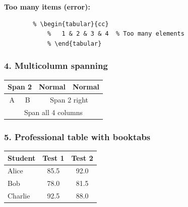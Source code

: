 \documentclass[12pt,a4paper]{article}
\begin{document}
	\textbf{Too many items (error):}
	\begin{verbatim}
		% \begin{tabular}{cc}
			%   1 & 2 & 3 & 4  % Too many elements
			% \end{tabular}
	\end{verbatim}
	
	\subsubsection*{4. Multicolumn spanning}
	\begin{tabular}{|c|c|c|c|}
		\hline
		\multicolumn{2}{|c|}{Span 2} & Normal & Normal \\
		\hline
		A & B & \multicolumn{2}{c|}{Span 2 right} \\
		\hline
		\multicolumn{4}{|c|}{Span all 4 columns} \\
		\hline
	\end{tabular}
	
	\subsubsection*{5. Professional table with booktabs}
	\begin{tabular}{l S[table-format=2.1] S[table-format=2.1]}
		\toprule
		Student & {Test 1} & {Test 2} \\
		\midrule
		Alice & 85.5 & 92.0 \\
		Bob & 78.0 & 81.5 \\
		Charlie & 92.5 & 88.0 \\
		\bottomrule
	\end{tabular}
	
\end{document}
